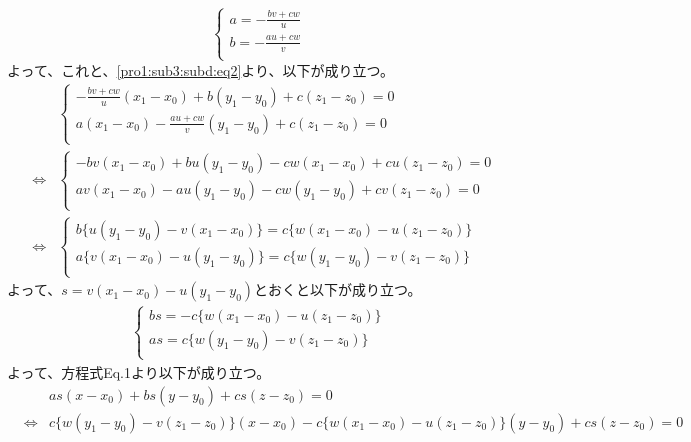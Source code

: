 \documentclass[dvipdfmx,titlepage, 11pt, a4paper]{jsarticle}%
\begin{document}
\begin{enumerate}[(1)]
\begin{enumerate}[(a)]
    \begin{equation*}
      \begin{cases}
        a = -\frac{bv + cw}{u}\\
        b = -\frac{au + cw}{v}\\
      \end{cases}
    \end{equation*}
    よって、これと、\eqref{pro1:sub3:subd:eq2}より、以下が成り立つ。
    \begin{eqnarray*}
      &&\begin{cases}
        -\frac{bv + cw}{u}(x_1 - x_0) + b(y_1 - y_0) + c(z_1 - z_0) = 0\\
        a(x_1 - x_0) - \frac{au + cw}{v}(y_1 - y_0) + c(z_1 - z_0) = 0\\
      \end{cases}\\
      &\Longleftrightarrow&
      \begin{cases}
        -bv(x_1 - x_0) + bu(y_1 - y_0) -cw(x_1 - x_0) + cu(z_1 - z_0) = 0\\
        av(x_1 - x_0) - au(y_1 - y_0) -cw(y_1 - y_0) + cv(z_1 - z_0) = 0\\
      \end{cases}\\
      &\Longleftrightarrow&
      \begin{cases}
        b\{u(y_1 - y_0) - v(x_1 - x_0)\} = c\{w(x_1 - x_0) - u(z_1 - z_0)\}\\
        a\{v(x_1 - x_0) - u(y_1 - y_0)\} = c\{w(y_1 - y_0) - v(z_1 - z_0)\}\\
      \end{cases}
    \end{eqnarray*}
    よって、$s = v(x_1 - x_0) - u(y_1 - y_0)$とおくと以下が成り立つ。
    \begin{eqnarray*}
      \begin{cases}
        bs = -c\{w(x_1 - x_0) - u(z_1 - z_0)\}\\
        as = c\{w(y_1 - y_0) - v(z_1 - z_0)\}\\
      \end{cases}
    \end{eqnarray*}
    よって、方程式Eq.1より以下が成り立つ。
    \begin{eqnarray*}
      &&as(x - x_0) + bs(y - y_0) + cs(z - z_0) = 0\\
      &\Longleftrightarrow&
      c\{w(y_1 - y_0) - v(z_1 - z_0)\}(x - x_0) - c\{w(x_1 - x_0) - u(z_1 - z_0)\}(y - y_0) + cs(z - z_0) = 0\\

\end{eqnarray*}
\end{enumerate}
\end{enumerate}
\end{document}
